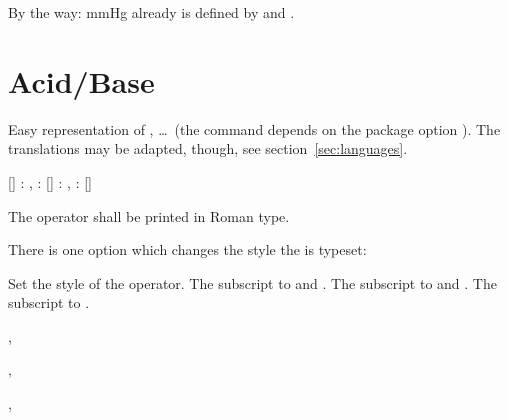\documentclass[load-preamble+]{cnltx-doc}
\begin{document}
By the way:  \si{\mmHg} already is defined by  and
.

\section{Acid/Base}\label{sec:saeure_base}

Easy representation of \pH, \pKa \ldots\ (the command  depends on the
package option ). The translations may be adapted, though,
see section~\ref{sec:languages}.
\begin{commands}
   \pH
   \pOH
   \Ka
   \Kb
   \Kw
  [] : \pKa, : \pKa[1]
  [] : \pKb, : \pKb[1]
  [] \eg\  \p{\Kw}
\end{commands}

\begin{example}
  \Ka \Kb \pKa \pKa[1] \pKb \pKb[1]
\end{example}

\begin{cnltxquote}
 The operator \p{} \textelp{} shall be printed in Roman type.
\end{cnltxquote}

There is one option which changes the style the \p{} is typeset:
\begin{options}
    Set the style of the \p{} operator.
    The subscript to  and .
    The subscript to  and .
    The subscript to .
\end{options}
\begin{example}
  \pH, \pKa \par
   \pH, \pKa \par
   \pH, \pKa
\end{example}
\end{document}
